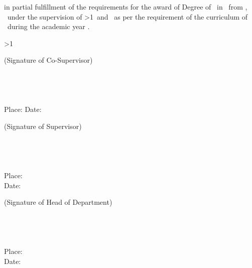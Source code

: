 \vspace{0.1cm}
in partial fulfillment of the requirements for the award of Degree of \GetDegreeType\ in \GetDepartment\ from \GetCollege,
\GetLocation\ under the supervision of \textbf{\GetSupervisor}%
\ifnum\GetHasCoSupervisor>1\relax\ and \textbf{\GetCoSupervisor}\fi\ as per the requirement of the
curriculum of \GetUniversity\ during the academic year \GetAY.

\vspace{0.2cm}

\ifnum\GetHasCoSupervisor>1\relax
\begin{flushleft}
(Signature of Co-Supervisor)\\[0.1cm]
\textbf{\GetCoSupervisor}\\
\GetCoSupervisorDesignation\\
\GetCoSupervisorDept\\
\GetCollege\\[0.1cm]
Place: \underline{\hspace{3cm}} \hspace{2cm} Date: \underline{\hspace{3cm}}
\end{flushleft}
\vspace{0.3cm}
\fi

\begin{minipage}[t]{0.47\textwidth}
\begin{flushleft}
(Signature of Supervisor)\\[0.2cm]
\textbf{\GetSupervisor}\\
\GetSupervisorDesignation\\
\GetSupervisorDept\\
\GetCollege\\[0.1cm]
Place: \underline{\hspace{2.5cm}}\\
Date: \underline{\hspace{2.5cm}}
\end{flushleft}
\end{minipage}%
\hfill
\begin{minipage}[t]{0.47\textwidth}
\begin{flushright}
(Signature of Head of Department)\\[0.2cm]
\textbf{\GetHoD}\\
\GetHoDDesignation\\
\GetHoDDept\\
\GetCollege\\[0.1cm]
Place: \underline{\hspace{2.5cm}}\\
Date: \underline{\hspace{2.5cm}}
\end{flushright}
\end{minipage}
\clearpage
{}
\cleardoublepage
